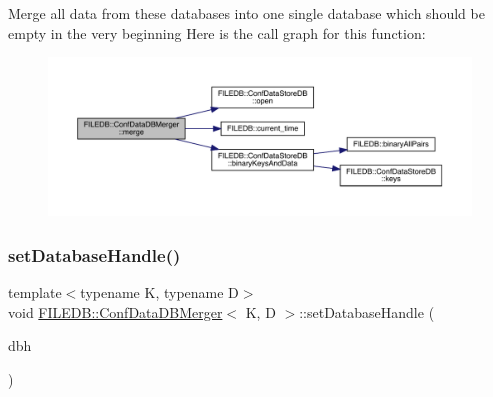 Merge all data from these databases into one single database which should be empty in the very beginning Here is the call graph for this function\+:
\nopagebreak
\begin{figure}[H]
\begin{center}
\leavevmode
\includegraphics[width=350pt]{db/d60/classFILEDB_1_1ConfDataDBMerger_a6738f9880645518ba94eccd3b2037f24_cgraph}
\end{center}
\end{figure}
\mbox{\label{classFILEDB_1_1ConfDataDBMerger_aba7a50569bcdc1beca3b82536fa5922b}} 
\subsubsection{\texorpdfstring{setDatabaseHandle()}{setDatabaseHandle()}\hspace{0.1cm}{\footnotesize\ttfamily [1/3]}}
{\footnotesize\ttfamily template$<$typename K, typename D$>$ \\
void \mbox{\hyperlink{classFILEDB_1_1ConfDataDBMerger}{F\+I\+L\+E\+D\+B\+::\+Conf\+Data\+D\+B\+Merger}}$<$ K, D $>$\+::set\+Database\+Handle (\begin{DoxyParamCaption}\item[{\mbox{\hyperlink{classFILEDB_1_1AllConfStoreDB}{All\+Conf\+Store\+DB}}$<$ K, D $>$ $\ast$}]{dbh }\end{DoxyParamCaption})\hspace{0.3cm}{\ttfamily [inline]}}

